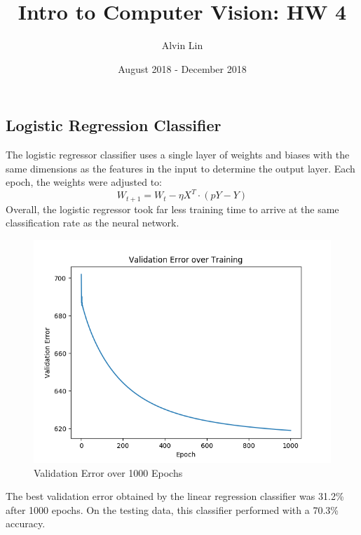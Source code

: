 \documentclass{math}
\title{Intro to Computer Vision: HW 4}
\author{Alvin Lin}
\date{August 2018 - December 2018}
\begin{document}
\maketitle
\captionsetup{justification=centering}

\subsection*{Logistic Regression Classifier}
The logistic regressor classifier uses a single layer of weights and biases
with the same dimensions as the features in the input to determine the output
layer. Each epoch, the weights were adjusted to:
\[ W_{t+1} = W_t-\eta X^T\cdot(pY-Y) \]
Overall, the logistic regressor took far less training time to arrive at the
same classification rate as the neural network.
\begin{figure}[H]
  \centering
  \includegraphics[width=12cm]{assets/hw_04_lr_cost.png}
  \caption{Validation Error over 1000 Epochs}
\end{figure}
The best validation error obtained by the linear regression classifier was
31.2\% after 1000 epochs. On the testing data, this classifier performed with a
70.3\% accuracy.
\end{document}
